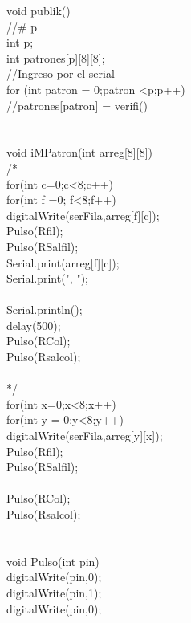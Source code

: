 \documentclass{article}
\begin{document}
void publik(){\\
//# p\\
  int p;\\
  int patrones[p][8][8];\\
  //Ingreso por el serial\\
  for (int patron = 0;patron <p;p++){\\
  	//patrones[patron] = verifi()\\
  } \\
}\\
void iMPatron(int arreg[8][8]){\\
  /*\\
  for(int c=0;c<8;c++){\\
    for(int f =0; f<8;f++){\\
      digitalWrite(serFila,arreg[f][c]);\\
      Pulso(Rfil);\\
      Pulso(RSalfil);\\
      
      Serial.print(arreg[f][c]);\\
      Serial.print(", ");\\
  }\\
  
  Serial.println();\\
  delay(500);\\
    
  Pulso(RCol);\\
  Pulso(Rsalcol);\\
  }\\
	*/\\
  for(int x=0;x<8;x++){\\
    for(int y = 0;y<8;y++){\\
      digitalWrite(serFila,arreg[y][x]);\\
      Pulso(Rfil);\\
      Pulso(RSalfil);\\
      
    }\\
  Pulso(RCol);\\
  Pulso(Rsalcol);\\

  }\\
}\\
void Pulso(int pin){\\
  digitalWrite(pin,0);\\
  digitalWrite(pin,1);\\
  digitalWrite(pin,0); \\
}\\
\end{document}
